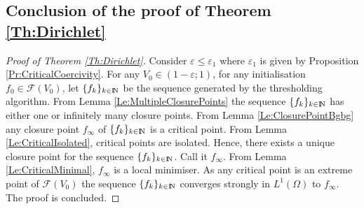 \documentclass{article}
\newcommand{\R}{\textnormal{I\kern-0.21emR}}
\newcommand{\N}{\textnormal{I\kern-0.21emN}}
\renewcommand{\geq}{\geqslant}
\renewcommand{\leq}{\leqslant}
\def\e{{\varepsilon}}
\def\O{{\Omega}}
\numberwithin{equation}{section}
\begin{document}
\subsection{Conclusion of the proof of Theorem \ref{Th:Dirichlet}}
\begin{proof}[Proof of Theorem \ref{Th:Dirichlet}]
Consider $\e\leq \e_1$ where $\e_1$ is given by Proposition \ref{Pr:CriticalCoercivity}. For any $V_0\in (1-\e;1)$, for any initialisation $f_0\in \mathcal F(V_0)$, let $\{f_k\}_{k\in \N}$ be the sequence generated by the thresholding algorithm. From Lemma \ref{Le:MultipleClosurePoints} the sequence $\{f_k\}_{k\in \N}$ has either one or infinitely many closure points. From  Lemma \ref{Le:ClosurePointBgbg} any closure point $f_\infty$ of $\{f_k\}_{k\in \N}$ is a critical point. From Lemma \ref{Le:CriticalIsolated}, critical points are isolated. Hence, there exists a unique closure point for the sequence $\{f_k\}_{k\in \N}$. Call it $f_\infty$. From Lemma \ref{Le:CriticalMinimal}, $f_\infty$ is a local minimiser. As any critical point is an extreme point of $\mathcal F(V_0)$ the sequence $\{f_k\}_{k\in \N}$ converges strongly in $L^1(\O)$ to $f_\infty$. The proof is concluded.
\end{proof}
%   
%
\end{document}
